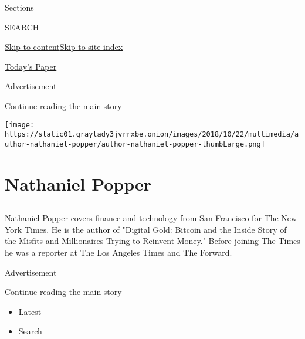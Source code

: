 Sections

SEARCH

\protect\hyperlink{site-content}{Skip to
content}\protect\hyperlink{site-index}{Skip to site index}

\href{https://myaccount.nytimes3xbfgragh.onion/auth/login?response_type=cookie\&client_id=vi}{}

\href{https://www.nytimes3xbfgragh.onion/section/todayspaper}{Today's
Paper}

Advertisement

\protect\hyperlink{after-top}{Continue reading the main story}

\texttt{[image: https://static01.graylady3jvrrxbe.onion/images/2018/10/22/multimedia/author-nathaniel-popper/author-nathaniel-popper-thumbLarge.png]}

\hypertarget{nathaniel-popper}{%
\section{Nathaniel Popper}\label{nathaniel-popper}}

\subsection{}

Nathaniel Popper covers finance and technology from San Francisco for
The New York Times. He is the author of "Digital Gold: Bitcoin and the
Inside Story of the Misfits and Millionaires Trying to Reinvent Money."
Before joining The Times he was a reporter at The Los Angeles Times and
The Forward.

Advertisement

\protect\hyperlink{after-mid1}{Continue reading the main story}

\begin{itemize}
\tightlist
\item
  \protect\hyperlink{stream-panel}{Latest}
\item
  Search
\end{itemize}

